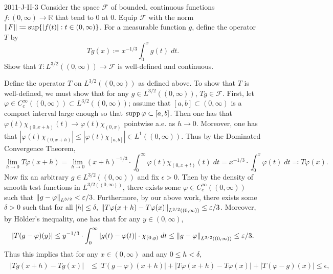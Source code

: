 \documentclass{article}
\begin{document}
	\begin{prb}{2011-J-II-3}
		Consider the space $\mathscr{F}$ of bounded, continuous functions $f: (0,\infty)\to \mathbb{R}$ that tend to 0 at 0. Equip $\mathscr{F}$ with the norm $\left\Vert F \right\Vert \coloneqq \sup\{|f(t)|: t \in (0,\infty)\}$. For a measurable function $g$, define the operator $T$ by 
		\begin{equation*}
			Tg(x) \coloneqq x^{-1/3}\int_{0}^{x}g(t)\;dt.
		\end{equation*}
		Show that $T: L^{3/2}((0,\infty)) \to \mathscr{F}$ is well-defined and continuous. 
	\end{prb}
	Define the operator $T$ on $L^{3/2}((0,\infty))$ as defined above. To show that $T$ is well-defined, we must show that for any $g \in L^{3/2}((0,\infty))$, $Tg \in \mathscr{F}$. First, let $\varphi \in C_{c}^{\infty}((0,\infty)) \subset L^{3/2}((0,\infty))$; assume that $[a,b] \subset (0, \infty)$ is a compact interval large enough so that $\operatorname{supp}{\varphi} \subset [a, b]$. Then one has that $\varphi(t)\chi_{(0, x + h)}(t) \to \varphi(t)\chi_{(0, x)}$ pointwise a.e. as $h \to 0$. Moreover, one has that $|\varphi(t)\chi_{(0, x + h)}|\leq |\varphi(t)\chi_{[a, b]}| \in L^{1}((0, \infty))$. Thus by the Dominated Convergence Theorem, 
	\begin{equation*}
		\lim_{h \to 0}T\varphi(x + h) = \lim_{h \to 0}(x + h)^{-1/3} \cdot \int_{0}^{\infty}\varphi(t)\chi_{(0, x + t)}(t)\;dt = x^{-1/3} \cdot \int_{0}^{x}\varphi(t)\;dt \eqqcolon T\varphi(x). 
	\end{equation*}
	Now fix an arbitrary $g \in L^{3/2}((0,\infty))$ and fix $\epsilon > 0$. Then by the density of smooth test functions in $L^{3/2((0,\infty))}$, there exists some $\varphi \in C_{c}^{\infty}((0,\infty))$ such that $\left\Vert g - \varphi \right\Vert_{L^{3/2}} < \varepsilon/3$. Furthermore, by our above work, there exists some $\delta > 0$ such that for all $|h|\leq \delta$, $\left\Vert T\varphi(x + h) - T\varphi(x) \right\Vert_{L^{3/2}((0,\infty))} \leq \varepsilon/3$. Moreover, by H\"older's inequality, one has that for any $y \in (0, \infty)$, 
	\begin{equation*}
		|T(g - \varphi)(y)| \leq y^{-1/3} \cdot \int_{0}^{\infty}|g(t) - \varphi(t)| \cdot \chi_{(0,y)}\;dt \leq \left\Vert g - \varphi \right\Vert_{L^{3/2}((0,\infty))} \leq \varepsilon/3. 
	\end{equation*}
	Thus this implies that for any $x \in (0, \infty)$ and any $0 \leq h < \delta$, 
	\begin{align*}
		\begin{split}
			|Tg(x + h) - Tg(x)| &\leq |T(g - \varphi)(x + h)| + |T\varphi(x + h) - T\varphi(x)| + |T(\varphi - g)(x)| \leq \epsilon, 
		\end{split} 
	\end{align*}
\end{document}

